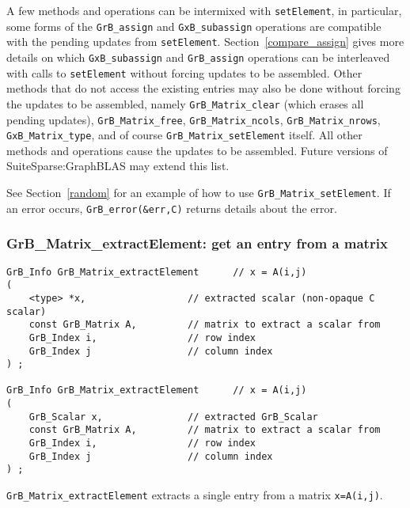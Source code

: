 \documentclass[12pt]{article}
\begin{document}
{A few methods and operations can be intermixed with \verb'setElement', in
particular, some forms of the \verb'GrB_assign' and \verb'GxB_subassign'
operations are compatible with the pending updates from \verb'setElement'.
Section~\ref{compare_assign} gives more details on which \verb'GxB_subassign'
and \verb'GrB_assign' operations can be interleaved with calls to
\verb'setElement' without forcing updates to be assembled.  Other methods that
do not access the existing entries may also be done without forcing the updates
to be assembled, namely \verb'GrB_Matrix_clear' (which erases all pending
updates), \verb'GrB_Matrix_free', \verb'GrB_Matrix_ncols',
\verb'GrB_Matrix_nrows', \verb'GxB_Matrix_type', and of course
\verb'GrB_Matrix_setElement' itself.  All other methods and operations cause
the updates to be assembled.  Future versions of SuiteSparse:GraphBLAS may
extend this list.

See Section~\ref{random} for an example of how to use
\verb'GrB_Matrix_setElement'.
If an error occurs, \verb'GrB_error(&err,C)' returns details about the error.

\newpage
\subsubsection{{\sf GrB\_Matrix\_extractElement:} get an entry from a matrix}
\label{matrix_extractElement}

\begin{mdframed}[userdefinedwidth=6in]
{\footnotesize
\begin{verbatim}
GrB_Info GrB_Matrix_extractElement      // x = A(i,j)
(
    <type> *x,                  // extracted scalar (non-opaque C scalar)
    const GrB_Matrix A,         // matrix to extract a scalar from
    GrB_Index i,                // row index
    GrB_Index j                 // column index
) ;

GrB_Info GrB_Matrix_extractElement      // x = A(i,j)
(
    GrB_Scalar x,               // extracted GrB_Scalar
    const GrB_Matrix A,         // matrix to extract a scalar from
    GrB_Index i,                // row index
    GrB_Index j                 // column index
) ;
\end{verbatim} } \end{mdframed}

\verb'GrB_Matrix_extractElement' extracts a single entry from a matrix
\verb'x=A(i,j)'.

}
\end{document}
